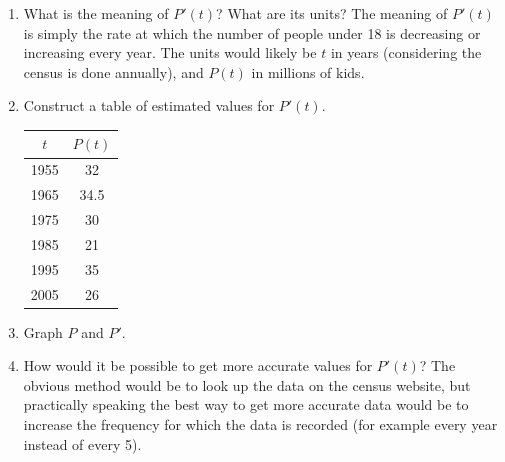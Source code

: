 \documentclass{article}
\begin{document}
\begin{enumerate}
\begin{center}
	\end{center}
	\begin{enumerate}
		\item What is the meaning of $P'(t)$? What are its units? \newline
			The meaning of $P'(t)$ is simply the rate at which the number of people under 18 is decreasing or increasing every year. The units would likely be $t$ in years (considering the census is done annually), and $P(t)$ in millions of kids.
		\item Construct a table of estimated values for $P'(t)$.
			\begin{center}
				\begin{tabular}{c|c}
				$t$    & $P(t)$  \\\hline
				1955 & 32 \\
				1965 & 34.5 \\
				1975 & 30 \\
				1985 & 21 \\
				1995 & 35 \\
				2005 & 26
				\end{tabular}
			\end{center}
		\pagebreak
		\item Graph $P$ and $P'$.
			\begin{center}
			\pgfplotsset{compat=1.8,width=0.6\linewidth,height=7cm}
			
			\end{center}
		\item How would it be possible to get more accurate values for $P'(t)$?\newline
			The obvious method would be to look up the data on the census website, but practically speaking the best way to get more accurate data would be to increase the frequency for which the data is recorded (for example every year instead of every 5).
	\end{enumerate}
\end{enumerate}
\end{document}
